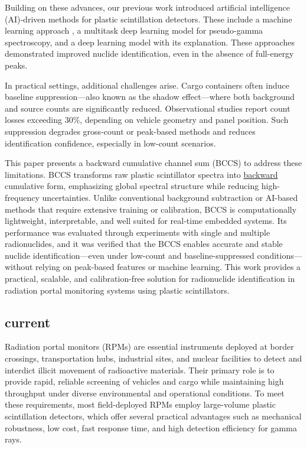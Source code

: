 \documentclass[10pt]{wlscirep}
\begin{document}
Building on these advances, our previous work introduced artificial intelligence (AI)-driven methods for plastic scintillation detectors. These include a machine learning approach \cite{Jeon2021CompML}, a multitask deep learning model for pseudo-gamma spectroscopy\cite{Jeon2021PseudoGamma}, and a deep learning model with its explanation\cite{Jeon2023Explanation}. These approaches demonstrated improved nuclide identification, even in the absence of full-energy peaks. 

In practical settings, additional challenges arise. Cargo containers often induce baseline suppression—also known as the shadow effect—where both background and source counts are significantly reduced. Observational studies report count losses exceeding 30\%, depending on vehicle geometry and panel position\cite{LoPresti2006BaselineSuppression}. Such suppression degrades gross-count or peak-based methods and reduces identification confidence, especially in low-count scenarios. 

This paper presents a backward cumulative channel sum (BCCS) to address these limitations. BCCS transforms raw plastic scintillator spectra into \ul{backward} cumulative form, emphasizing global spectral structure while reducing high-frequency uncertainties. Unlike conventional background subtraction or AI-based methods that require extensive training or calibration, BCCS is computationally lightweight, interpretable, and well suited for real-time embedded systems. Its performance was evaluated through experiments with single and multiple radionuclides, and it was verified that the BCCS enables accurate and stable nuclide identification—even under low-count and baseline-suppressed conditions—without relying on peak-based features or machine learning. This work provides a practical, scalable, and calibration-free solution for radionuclide identification in radiation portal monitoring systems using plastic scintillators.

\subsection*{current}
Radiation portal monitors (RPMs) are essential instruments deployed at border crossings, transportation hubs, industrial sites, and nuclear facilities to detect and interdict illicit movement of radioactive materials. Their primary role is to provide rapid, reliable screening of vehicles and cargo while maintaining high throughput under diverse environmental and operational conditions. To meet these requirements, most field-deployed RPMs employ large-volume plastic scintillation detectors, which offer several practical advantages such as mechanical robustness, low cost, fast response time, and high detection efficiency for gamma rays.\cite{Sicilliano2005Comparision, Bertrand2014Current}
\end{document}
